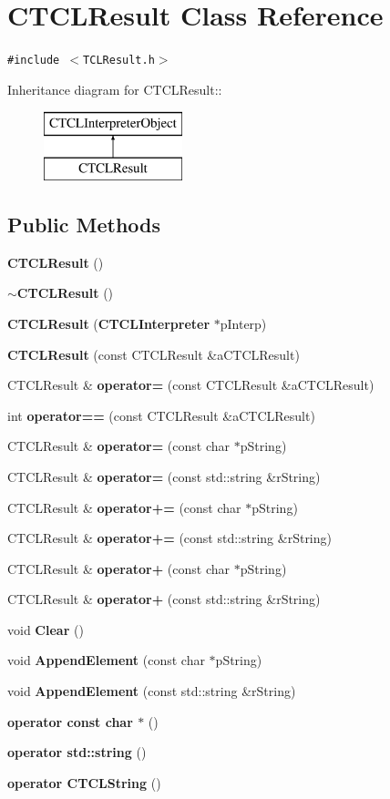 \section{CTCLResult  Class Reference}
\label{classCTCLResult}
{\tt \#include $<$TCLResult.h$>$}

Inheritance diagram for CTCLResult::\begin{figure}[H]
\begin{center}
\leavevmode
\includegraphics[height=2cm]{classCTCLResult}
\end{center}
\end{figure}
\subsection*{Public Methods}
\begin{CompactItemize}
\item 
{\bf CTCLResult} ()
\item 
{\bf $\sim$CTCLResult} ()
\item 
{\bf CTCLResult} ({\bf CTCLInterpreter} $\ast$p\-Interp)
\item 
{\bf CTCLResult} (const CTCLResult \&a\-CTCLResult)
\item 
CTCLResult \& {\bf operator=} (const CTCLResult \&a\-CTCLResult)
\item 
int {\bf operator==} (const CTCLResult \&a\-CTCLResult)
\item 
CTCLResult \& {\bf operator=} (const char $\ast$p\-String)
\item 
CTCLResult \& {\bf operator=} (const std::string \&r\-String)
\item 
CTCLResult \& {\bf operator+=} (const char $\ast$p\-String)
\item 
CTCLResult \& {\bf operator+=} (const std::string \&r\-String)
\item 
CTCLResult \& {\bf operator+} (const char $\ast$p\-String)
\item 
CTCLResult \& {\bf operator+} (const std::string \&r\-String)
\item 
void {\bf Clear} ()
\item 
void {\bf Append\-Element} (const char $\ast$p\-String)
\item 
void {\bf Append\-Element} (const std::string \&r\-String)
\item 
{\bf operator const char $\ast$} ()
\item 
{\bf operator std::string} ()
\item 
{\bf operator CTCLString} ()
\end{CompactItemize}


